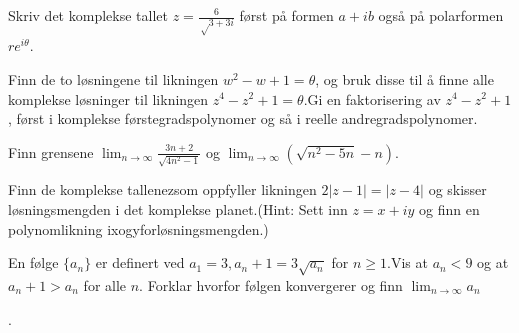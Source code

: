 \documentclass{myassignment}
\begin{document}
\begin{problem}
Skriv det komplekse tallet $z=\frac{6}{√{3}+3i}$ først på formen $a+ib$ også på polarformen $re^{i\theta}$.
\end{problem}

\begin{answer}

\end{answer}


\begin{problem}
Finn de to løsningene til likningen $w^2 - w + 1 = \theta$, og bruk disse til å finne alle komplekse løsninger til likningen $z^4 - z^2 + 1 = \theta$.Gi en faktorisering av $z^4 - z^2 + 1$, først i komplekse førstegradspolynomer og så i reelle andregradspolynomer.
\end{problem}

\begin{answer}

\end{answer}


\begin{problem}
Finn grensene $\lim_{n \rightarrow \infty}\frac{3n + 2}{\sqrt{4n^2 - 1}}$ og $\lim_{n\rightarrow\infty}(\sqrt{n^2 - 5n} - n)$.
\end{problem}

\begin{answer}

\end{answer}


\begin{problem}
Finn de komplekse tallenezsom oppfyller likningen $2|z - 1|=|z - 4|$ og skisser løsningsmengden i det komplekse planet.(Hint: Sett inn $z=x+iy$ og finn en polynomlikning ixogyforløsningsmengden.)
\end{problem}

\begin{answer}

\end{answer}


\begin{problem}
En følge $\{ a_n \}$ er definert ved $a_1 = 3, a_n + 1 = 3\sqrt{a_n}$ for $n \geq 1$.Vis at $a_n < 9$ og at $a_n+1 > a_n$ for alle $n$. Forklar hvorfor følgen konvergerer og finn $\lim_{n \rightarrow \infty}{a_n}$
\end{problem}

\begin{answer}

\end{answer}.
\end{document}
